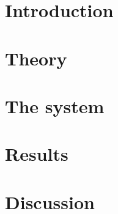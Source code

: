 \documentclass[12pt, twoside]{report}
\begin{document}

\newpage
{}

\newpage
{
    \hypersetup{linkcolor=black}
    \tableofcontents
}
\newpage
{}
\chapter{Introduction}

\chapter{Theory}\label{sec:theory}

\chapter{The system}\label{sec:sys}

\chapter{Results}\label{sec:res}

\chapter{Discussion}\label{sec:disc}


\newpage
\printbibliography
\appendix
\end{document}
